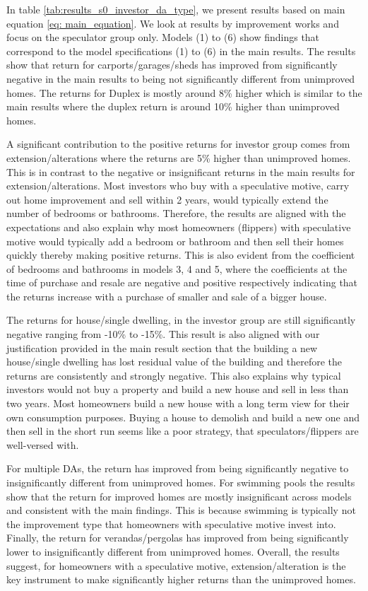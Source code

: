 \documentclass[AEJ,reqno, draftmode]{AEA} %
\begin{document}
In table \ref{tab:results_s0_investor_da_type}, we present results based on main equation \eqref{eq: main_equation}. We look at results by improvement works and focus on the speculator group only. Models (1) to (6) show findings that correspond to the model specifications (1) to (6) in the main results. The results show that return for carports/garages/sheds has improved from significantly negative in the main results to being not significantly different from unimproved homes. The returns for Duplex is mostly around 8\% higher which is similar to the main results where the duplex return is around 10\% higher than unimproved homes. 


\restoregeometry

A significant contribution to the positive returns for investor group comes from extension/alterations where the returns are 5\% higher than unimproved homes. This is in contrast to the negative or insignificant returns in the main results for extension/alterations. Most investors who buy with a speculative motive, carry out home improvement and sell within 2 years, would typically extend the number of bedrooms or bathrooms. Therefore, the results are aligned with the expectations and also explain why most homeowners (flippers) with speculative motive would typically add a bedroom or bathroom and then sell their homes quickly thereby making positive returns. This is also evident from the coefficient of bedrooms and bathrooms in models 3, 4 and 5, where the coefficients at the time of purchase and resale are negative and positive respectively indicating that the returns increase with a purchase of smaller and sale of a bigger house.

The returns for house/single dwelling, in the investor group are still significantly negative ranging from -10\% to -15\%. This result is also aligned with our justification provided in the main result section that the building a new house/single dwelling has lost residual value of the building and therefore the returns are consistently and strongly negative. This also explains why typical investors would not buy a property and build a new house and sell in less than two years. Most homeowners build a new house with a long term view for their own consumption purposes. Buying a house to demolish and build a new one and then sell in the short run seems like a poor strategy, that speculators/flippers are well-versed with.

For multiple DAs, the return has improved from being significantly negative to insignificantly different from unimproved homes. For swimming pools the results show that the return for improved homes are mostly insignificant across models and consistent with the main findings. This is because swimming is typically not the improvement type that homeowners with speculative motive invest into. Finally, the return for verandas/pergolas has improved from being significantly lower to insignificantly different from unimproved homes. Overall, the results suggest, for homeowners with a speculative motive, extension/alteration is the key instrument to make significantly higher returns than the unimproved homes.
\end{document}
